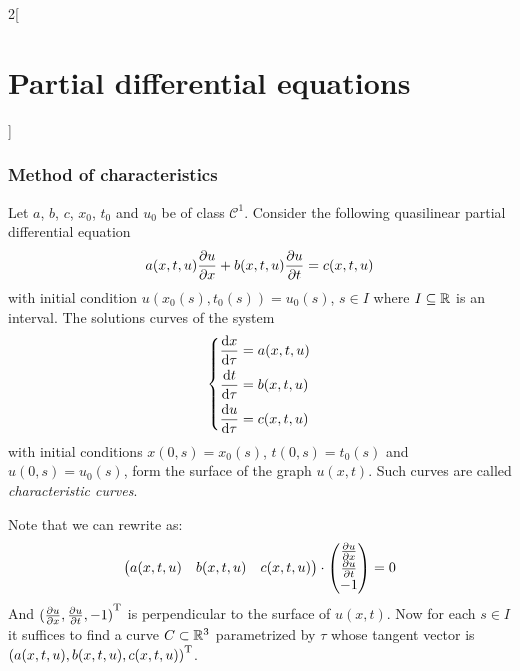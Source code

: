 \documentclass[../../../main_math.tex]{subfiles}
\begin{document}
\begin{multicols}{2}[\section{Partial differential equations}]
  \subsubsection{Method of characteristics}
  \begin{proposition}\label{PDE:charmethod} %
    Let $a$, $b$, $c$, $x_0$, $t_0$ and $u_0$ be of class $\mathcal{C}^1$. Consider the following quasilinear partial differential equation
    \begin{equation}\label{PDE:char}
      a(x,t,u)\pdv{u}{x}+b(x,t,u)\pdv{u}{t}=c(x,t,u)
    \end{equation}
    with initial condition $u(x_0(s),t_0(s))=u_0(s)$, $s\in I$ where $I\subseteq \mathbb{R}$ is an interval. The solutions curves of the system
    \begin{equation*}
      \left\{
      \begin{aligned}
        \dv{x}{\tau} & = a(x,t,u) \\
        \dv{t}{\tau} & = b(x,t,u) \\
        \dv{u}{\tau} & = c(x,t,u) \\
      \end{aligned}
      \right.
    \end{equation*}
    with initial conditions $x(0,s)=x_0(s)$, $t(0,s)=t_0(s)$ and $u(0,s)=u_0(s)$, form the surface of the graph $u(x,t)$. Such curves are called \emph{characteristic curves}.
  \end{proposition}
  \begin{sproof}
    Note that we can rewrite  as: $$\begin{pmatrix}
        a(x,t,u) & b(x,t,u) & c(x,t,u)
      \end{pmatrix}\cdot\begin{pmatrix}
        \pdv{u}{x} \\
        \pdv{u}{t} \\
        -1
      \end{pmatrix}=0$$
    And ${(\pdv{u}{x},\pdv{u}{t}, -1)}^{\mathrm{T}}$ is perpendicular to the surface of $u(x,t)$. Now for each $s\in I$ it suffices to find a curve $C\subset\mathbb{R}^3$ parametrized by $\tau$ whose tangent vector is ${(a(x,t,u), b(x,t,u), c(x,t,u))}^{\mathrm{T}}$.
  \end{sproof}

\end{multicols}
\end{document}
